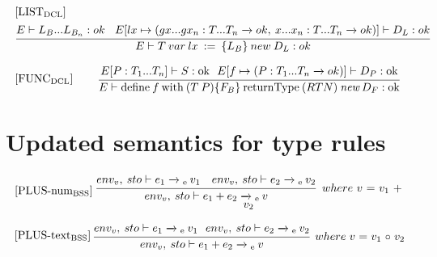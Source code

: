 \begin{equation}
\begin{split}
\begin{minipage}{\linewidth}
$[\text{LIST}_\text{DCL}]$
\end{minipage}
\\
\begin{minipage}{\linewidth}
\centering
$\cfrac{E \vdash L_B...L_{B_{n}} : ok \: \: \: \: E[lx \mapsto (gx...gx_n : T...T_n \xrightarrow{} ok, \: x...x_n : T...T_n \xrightarrow{} ok)] \vdash D_L: ok}{E \vdash T \: var \: lx \: := \: \{L_B\} \: new \: D_L : ok}$
\end{minipage}
\end{split}
\end{equation}

\begin{equation}
\begin{minipage}{.2\linewidth}
$[\text{FUNC}_\text{DCL}]$
\end{minipage}
\begin{minipage}{.8\linewidth}
\centering
$\cfrac{E[P : T_1...T_n] \vdash S : \text{ok} \: \: \: E[f \mapsto (P: T_1...T_n \xrightarrow{} ok)] \vdash D_P : \text{ok}}{E \vdash \text{define} \: f \: \text{with} \: (T \: P) \{F_B\} \: \text{returnType} \: (RTN) \: \textit{new} \: D_F : \text{ok}}$
\end{minipage}
\end{equation}

\section{Updated semantics for type rules}\label{typerules:UpdatedExpressions}
\begin{equation}
\begin{minipage}{.2\linewidth}
$[\text{PLUS-num}_\text{BSS}]$
\end{minipage}
\begin{minipage}{.8\linewidth}
\centering
$\cfrac{env_v, \: sto \vdash e_1 \xrightarrow{}\textsubscript{e} \: v_1 \quad env_v, \: sto \vdash e_2 \xrightarrow{}\textsubscript{e} \: v_2}{env_v, \: sto \vdash e_1 + e_2 \xrightarrow{}\textsubscript{e} \: v}$
$ \: where$ $v$ $=$ $v_1$ $+$ $v_2$
\end{minipage}
\end{equation}

\begin{equation}
\begin{minipage}{.2\linewidth}
$[\text{PLUS-text}_\text{BSS}]$
\end{minipage}
\begin{minipage}{.8\linewidth}
\centering
$\cfrac{env_v, \: sto \vdash e_1 \xrightarrow{}\textsubscript{e} \: v_1 \: \: \: env_v, \: sto \vdash e_2 \xrightarrow{}\textsubscript{e} \: v_2}{env_v, \: sto \vdash e_1 + e_2 \xrightarrow{}\textsubscript{e} \: v}$
$ \: where$ $v$ $=$ $v_1$ $\circ$ $v_2$
\end{minipage}
\end{equation}


